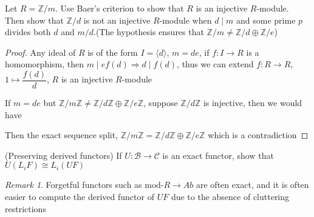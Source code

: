 \documentclass{article}
\newenvironment{exercise}[2][Exercise]{\begin{trivlist}
\item[\hskip \labelsep {\bfseries #1}\hskip \labelsep {\bfseries #2.}]}{\end{trivlist}}
\theoremstyle{definition}
\theoremstyle{remark}
\newtheorem*{remark}{Remark}
\theoremstyle{definition}
\begin{document}
\begin{exercise}{\textbf{2.3.1}}
Let $R=\mathbb Z/m$. Use Baer's criterion to show that $R$ is an injective $R$-module. Then show that $\mathbb Z/d$ is not an injective $R$-module when $d\mid m$ and some prime $p$ divides both $d$ and $m/d$.(The hypothesis ensures that $\mathbb Z/m\neq\mathbb Z/d\oplus\mathbb Z/e$)
\end{exercise}

\begin{proof}
Any ideal of $R$ is of the form $I=\langle d\rangle$, $m=de$, if $f:I\to R$ is a homomorphism, then $m\mid ef(d)\Rightarrow d\mid f(d)$, thus we can extend $f:R\to R$, $1\mapsto\dfrac{f(d)}{d}$, $R$ is an injective $R$-module \par
If $m=de$ but $\mathbb Z/m\mathbb Z\neq\mathbb Z/d\mathbb Z\oplus\mathbb Z/e\mathbb Z$, suppose $\mathbb Z/d\mathbb Z$ is injective, then we would have
\begin{center}
\end{center}
Then the exact sequence split, $\mathbb Z/m\mathbb Z=\mathbb Z/d\mathbb Z\oplus\mathbb Z/e\mathbb Z$ which is a contradiction
\end{proof}

\begin{exercise}{\textbf{2.4.2}}(Preserving derived functors)
If $U:\mathscr B\to\mathscr C$ is an exact functor, show that $U(L_iF)\cong L_i(UF)$
\end{exercise}

\begin{remark}
Forgetful functors such as $\mathrm{mod}$-$R\to Ab$ are often exact, and it is often easier to compute the derived functor of $UF$ due to the absence of cluttering restrictions
\end{remark}
\end{document}
